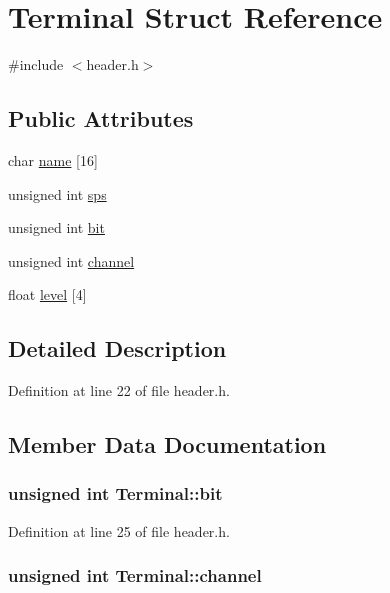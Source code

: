 \hypertarget{structTerminal}{
\section{Terminal Struct Reference}
\label{structTerminal}
}


{\ttfamily \#include $<$header.h$>$}\subsection*{Public Attributes}
\begin{DoxyCompactItemize}
\item 
char \hyperlink{structTerminal_a33735d179d26b1779c4c5523d839daec}{name} \mbox{[}16\mbox{]}
\item 
unsigned int \hyperlink{structTerminal_aa40fe0e25771a5cfb4d1b3ad89f579ce}{sps}
\item 
unsigned int \hyperlink{structTerminal_a8326c144e078321f15dd2057f72f8077}{bit}
\item 
unsigned int \hyperlink{structTerminal_a49c2d2ffe63e005bf80fba12ee8af7ef}{channel}
\item 
float \hyperlink{structTerminal_a0b8981c1518ca73a30d52c9947a69303}{level} \mbox{[}4\mbox{]}
\end{DoxyCompactItemize}


\subsection{Detailed Description}


Definition at line 22 of file header.h.

\subsection{Member Data Documentation}
\hypertarget{structTerminal_a8326c144e078321f15dd2057f72f8077}{
\subsubsection[{bit}]{\setlength{\rightskip}{0pt plus 5cm}unsigned int {\bf Terminal::bit}}}
\label{structTerminal_a8326c144e078321f15dd2057f72f8077}


Definition at line 25 of file header.h.\hypertarget{structTerminal_a49c2d2ffe63e005bf80fba12ee8af7ef}{
\subsubsection[{channel}]{\setlength{\rightskip}{0pt plus 5cm}unsigned int {\bf Terminal::channel}}}
\label{structTerminal_a49c2d2ffe63e005bf80fba12ee8af7ef}


